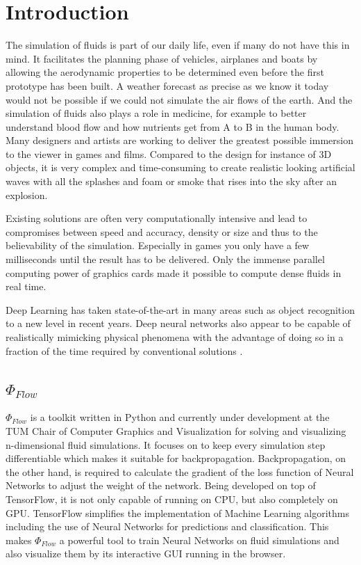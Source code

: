 \chapter{Introduction}\label{chapter:introduction}
The simulation of fluids is part of our daily life, even if many do not have this in mind. It facilitates the planning phase of vehicles, airplanes and boats by allowing the aerodynamic properties to be determined even before the first prototype has been built. A weather forecast as precise as we know it today would not be possible if we could not simulate the air flows of the earth. And the simulation of fluids also plays a role in medicine, for example to better understand blood flow and how nutrients get from A to B in the human body. Many designers and artists are working to deliver the greatest possible immersion to the viewer in games and films. Compared to the design for instance of 3D objects, it is very complex and time-consuming to create realistic looking artificial waves with all the splashes and foam or smoke that rises into the sky after an explosion.
\par Existing solutions are often very computationally intensive and lead to compromises between speed and accuracy, density or size and thus to the believability of the simulation. Especially in games you only have a few milliseconds until the result has to be delivered. Only the immense parallel computing power of graphics cards made it possible to compute dense fluids in real time. 
\par Deep Learning has taken state-of-the-art in many areas such as object recognition to a new level in recent years. Deep neural networks also appear to be capable of realistically mimicking physical phenomena with the advantage of doing so in a fraction of the time required by conventional solutions \parencite{tompson2017accelerating}.
\section{$\Phi_\textit{Flow}$ }
$\Phi_\textit{Flow}$ is a toolkit written in Python and currently under development at the TUM Chair of Computer Graphics and Visualization for solving and visualizing n-dimensional fluid simulations. It focuses on to keep every simulation step differentiable which makes it suitable for backpropagation. Backpropagation, on the other hand, is required to calculate the gradient of the loss function of Neural Networks to adjust the weight of the network. Being developed on top of TensorFlow, it is not only capable of running on CPU, but also completely on GPU. TensorFlow simplifies the implementation of Machine Learning algorithms including the use of Neural Networks for predictions and classification. This makes $\Phi_\textit{Flow}$ a powerful tool to train Neural Networks on fluid simulations and also visualize them by its interactive GUI running in the browser. 
